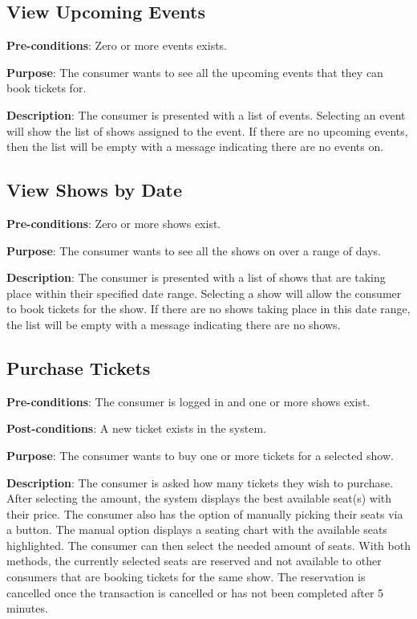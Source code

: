 \subsection{View Upcoming Events}
\textbf{Pre-conditions}: Zero or more events exists.

\textbf{Purpose}: The consumer wants to see all the upcoming events
that they can book tickets for.

\textbf{Description}: The consumer is presented with a list of
events. Selecting an event will show the list of shows assigned to
the event. If there are no upcoming events, then the list will be
empty with a message indicating there are no events on.

\subsection{View Shows by Date}
\textbf{Pre-conditions}: Zero or more shows exist.

\textbf{Purpose}: The consumer wants to see all the shows on over a
range of days.

\textbf{Description}: The consumer is presented with a list of shows
that are taking place within their specified date range. Selecting
a show will allow the consumer to book tickets for the show. If
there are no shows taking place in this date range, the list will be
empty with a message indicating there are no shows.

\subsection{Purchase Tickets}
\textbf{Pre-conditions}: The consumer is logged in and one or more
shows exist.

\textbf{Post-conditions}: A new ticket exists in the system.

\textbf{Purpose}: The consumer wants to buy one or more tickets for
a selected show.

\textbf{Description}: The consumer is asked how many tickets they
wish to purchase. After selecting the amount, the system displays
the best available seat(s) with their price. The consumer also has
the option of manually picking their seats via a button. The manual
option displays a seating chart with the available seats
highlighted. The consumer can then select the needed amount of
seats. With both methods, the currently selected seats are reserved
and not available to other consumers that are booking tickets for
the same show. The reservation is cancelled once the transaction
is cancelled or has not been completed after 5 minutes.


